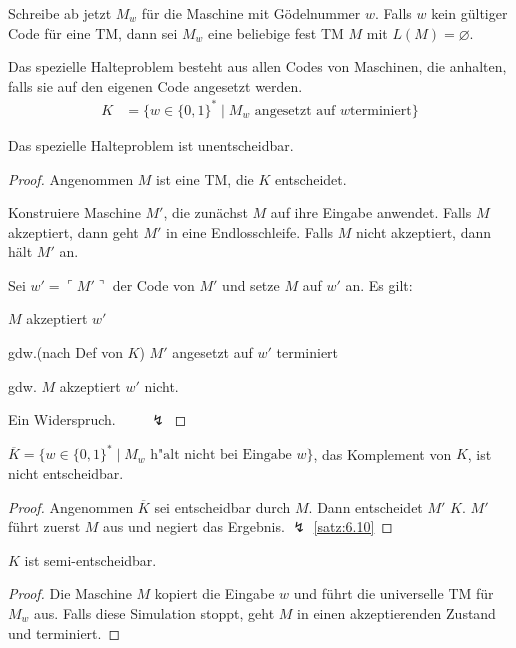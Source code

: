 Schreibe ab jetzt $M_w$ für die Maschine mit Gödelnummer $w$. Falls
$w$ kein gültiger Code für eine \ac{TM}, dann sei $M_w$ eine beliebige fest
\ac{TM} $M$ mit $L(M) = \varnothing$.
\begin{Def}[name={[Spezielles Halteproblem]}]
  Das spezielle Halteproblem besteht aus allen Codes von Maschinen, die
  anhalten, falls sie auf den eigenen Code angesetzt werden.
  \begin{align*}
    K &= \{ w \in \{0,1\}^* \mid M_w \text{ angesetzt auf }w\text{
        terminiert} \}
  \end{align*}
\end{Def}
\begin{Satz}\label{satz:6.10}
  Das spezielle Halteproblem ist unentscheidbar.
\end{Satz}
\begin{proof}
  Angenommen $M$ ist eine \ac{TM}, die $K$ entscheidet.

  Konstruiere Maschine $M'$, die zunächst $M$ auf ihre Eingabe
  anwendet. Falls $M$ akzeptiert, dann geht $M'$ in eine
  Endlosschleife. Falls $M$ nicht akzeptiert, dann hält $M'$ an.

  Sei $w' = \ulcorner M' \urcorner$ der Code von $M'$ und setze $M$
  auf $w'$ an. Es gilt:

  $M$ akzeptiert $w'$

  gdw.(nach Def von $K$) $M'$ angesetzt auf $w'$ terminiert

  gdw. $M$ akzeptiert $w'$ nicht.

  Ein Widerspruch. $\qquad\lightning$
\end{proof}
\begin{Korollar}\label{kor:6.11}
  $\overline{K} = \{w \in\{0,1\}^* \mid M_w\text{ h"alt nicht bei
    Eingabe }w \}$,   das Komplement von $K$, 
  ist nicht entscheidbar.
\end{Korollar}
\begin{proof}
	Angenommen $\overline{K}$ sei entscheidbar durch $M$. Dann
        entscheidet $M'$  $K$. $M'$ führt zuerst $M$ aus und negiert das Ergebnis. $\lightning$ \autoref{satz:6.10}
\end{proof}
\begin{lemma}[name={[$K$ ist semi-entscheidbar]}]
	$K$ ist semi-entscheidbar.
\end{lemma}
\begin{proof}
  Die Maschine $M$ kopiert die Eingabe $w$ und führt die universelle
  \ac{TM} für $M_w$ aus. Falls diese Simulation stoppt, geht $M$ in einen
  akzeptierenden Zustand und terminiert.
\end{proof}
